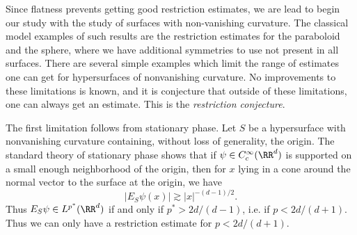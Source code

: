 Since flatness prevents getting good restriction estimates, we are lead to begin our study with the study of surfaces with non-vanishing curvature. The classical model examples of such results are the restriction estimates for the paraboloid and the sphere, where we have additional symmetries to use not present in all surfaces. There are several simple examples which limit the range of estimates one can get for hypersurfaces of nonvanishing curvature. No improvements to these limitations is known, and it is conjecture that outside of these limitations, one can always get an estimate. This is the \emph{restriction conjecture}.

The first limitation follows from stationary phase. Let $S$ be a hypersurface with nonvanishing curvature containing, without loss of generality, the origin. The standard theory of stationary phase shows that if $\psi \in C_c^\infty(\RR^d)$ is supported on a small enough neighborhood of the origin, then for $x$ lying in a cone around the normal vector to the surface at the origin, we have
%
\[ |E_S \psi(x)| \gtrsim |x|^{-(d-1)/2}. \]
%
Thus $E_S \psi \in L^{p^*}(\RR^d)$ if and only if $p^* > 2d/(d-1)$, i.e. if $p < 2d/(d+1)$. Thus we can only have a restriction estimate for $p < 2d/(d+1)$.


